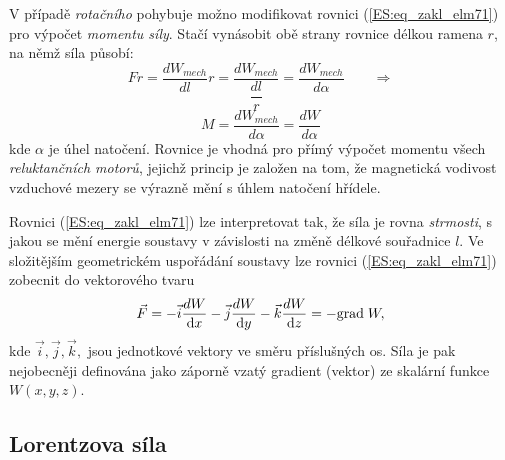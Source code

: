      V	případě \emph{rotačního} pohybuje možno modifikovat rovnici (\ref{ES:eq_zakl_elm71}) pro 
      výpočet \emph{momentu síly}. Stačí vynásobit obě strany rovnice délkou ramena \(r\), na němž 
      síla působí:
      \begin{equation*}
        Fr = \frac{dW_{mech}}{dl}r 
           = \frac{dW_{mech}}{\dfrac{dl}{r}} 
           = \frac{dW_{mech}}{d\alpha}
             \qquad \Longrightarrow
      \end{equation*}
      \begin{equation}\label{ES:eq_zakl_elm82}
        \boxed{M = \frac{dW_{mech}}{d\alpha} = \frac{dW}{d\alpha}}
      \end{equation}
      kde \(\alpha\) je úhel natočení. Rovnice je vhodná pro přímý výpočet momentu všech 
      \emph{reluktančních motorů}, jejichž princip je založen na tom, že magnetická vodivost 
      vzduchové mezery se výrazně mění s úhlem natočení hřídele.
      
      Rovnici (\ref{ES:eq_zakl_elm71}) lze interpretovat tak, že síla je rovna \emph{strmosti}, s 
      jakou se mění energie soustavy v závislosti na změně délkové souřadnice \(l\). Ve složitějším 
      geometrickém uspořádání soustavy lze rovnici (\ref{ES:eq_zakl_elm71}) zobecnit do vektorového 
      tvaru
      \begin{equation}\label{ES:eq_zakl_elm83}
       \vec{F} = -\vec{i}\frac{dW}{\mathop{}\!\mathrm{d}x} -\vec{j}\frac{dW}{\mathop{}\!\mathrm{d}y} -\vec{k}\frac{dW}{\mathop{}\!\mathrm{d}z} 
               = - \mathrm{grad\;}W,
      \end{equation}
      kde \(\vec{i}, \vec{j}, \vec{k},\) jsou jednotkové vektory ve směru příslušných os. Síla je 
      pak nejobecněji definována jako záporně vzatý gradient (vektor) ze skalární funkce 
      \(W(x,y,z)\).
      
    \subsection{Lorentzova síla}
      
